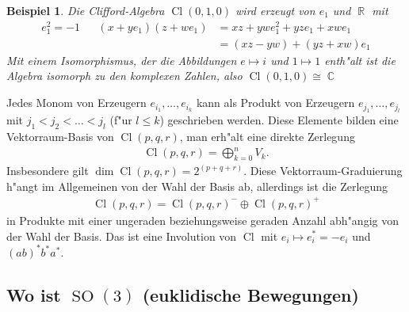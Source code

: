 \documentclass[paper=A4, twoside, chapterprefix=true, bibliography=totoc, headsepline]{scrbook}
\DeclareMathOperator{\C}{\mathbb{C}}
\DeclareMathOperator{\R}{\mathbb{R}}
\DeclareMathOperator{\Cl}{Cl}
\DeclareMathOperator{\SO}{SO} %
\theoremstyle{nonumberbreak}
\newtheorem{bsp}{Beispiel}
\theoremstyle{emptybreak}
\theoremstyle{break}
\begin{document}
\begin{bsp}
Die Clifford-Algebra $\Cl(0, 1, 0)$ wird erzeugt von $e_1$ und $\R$ mit
\begin{align*}
	e_1^2 = -1 && (x + y e_1) (z + w e_1) &= xz + yw e_1^2 + yz e_1 + xw e_1 \\
	&&&= (xz - yw) + (yz + xw) e_1
\end{align*}
Mit einem Isomorphismus, der die Abbildungen $e \mapsto i$ und $1 \mapsto 1$ enth"alt ist die Algebra isomorph zu den komplexen Zahlen, also $\Cl(0, 1, 0) \cong \C$
\end{bsp}

Jedes Monom von Erzeugern  $e_{i_1}, \ldots, e_{i_k}$ kann als Produkt von Erzeugern $e_{j_1}, \ldots, e_{j_l}$ mit $j_1 < j_2 < \ldots < j_l$ (f"ur $l \le k$) geschrieben werden.
Diese Elemente bilden eine Vektorraum-Basis von $\Cl(p, q, r)$, man erh"alt eine direkte Zerlegung
\begin{align*}
	\Cl(p, q, r) = \bigoplus_{k=0}^n V_k.
\end{align*}
Insbesondere gilt $\dim \Cl(p, q, r) = 2^{(p + q + r)}$.
Diese Vektorraum-Graduierung h"angt im Allgemeinen von der Wahl der Basis ab, allerdings ist die Zerlegung
\begin{align*}
	\Cl(p, q, r) = \Cl(p, q, r)^- \oplus \Cl(p, q, r)^+
\end{align*}
in Produkte mit einer ungeraden beziehungsweise geraden Anzahl abh"angig von der Wahl der Basis.
Das ist eine Involution von $\Cl$ mit $e_i \mapsto e_i^* = -e_i$ und $(ab)^*  b^* a^*$.


\subsection*{Wo ist $\SO(3)$ (euklidische Bewegungen)}
\end{document}
